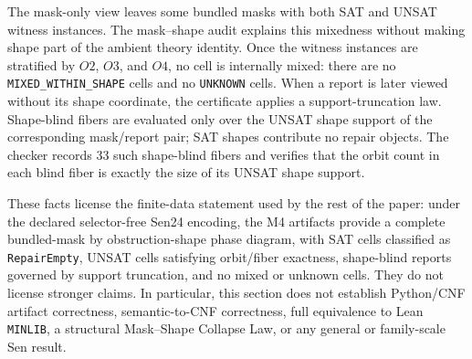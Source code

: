 The mask-only view leaves some bundled masks with both SAT and UNSAT witness
instances. The mask--shape audit explains this mixedness without making shape
part of the ambient theory identity. Once the witness instances are stratified
by \(O2\), \(O3\), and \(O4\), no cell is internally mixed: there are no
\texttt{MIXED\_WITHIN\_SHAPE} cells and no \texttt{UNKNOWN} cells. When a
report is later viewed without its shape coordinate, the certificate applies a
support-truncation law. Shape-blind fibers are evaluated only over the UNSAT
shape support of the corresponding mask/report pair; SAT shapes contribute no
repair objects. The checker records 33 such shape-blind fibers and verifies
that the orbit count in each blind fiber is exactly the size of its UNSAT shape
support.

These facts license the finite-data statement used by the rest of the paper:
under the declared selector-free Sen24 encoding, the M4 artifacts provide a
complete bundled-mask by obstruction-shape phase diagram, with SAT cells
classified as \texttt{RepairEmpty}, UNSAT cells satisfying orbit/fiber
exactness, shape-blind reports governed by support truncation, and no mixed or
unknown cells. They do not license stronger claims. In particular, this
section does not establish Python/CNF artifact correctness, semantic-to-CNF
correctness, full equivalence to Lean \texttt{MINLIB}, a structural
Mask--Shape Collapse Law, or any general or family-scale Sen result.
